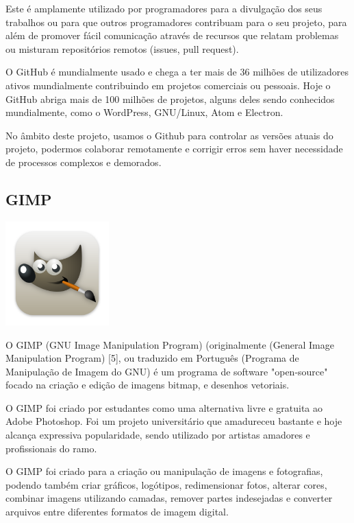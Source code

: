 \documentclass[a4paper,12pt]{article}
\begin{document}
Este é amplamente utilizado por programadores para a divulgação dos seus trabalhos ou para que outros programadores contribuam para o seu projeto, para além de promover fácil comunicação através de recursos que relatam problemas ou misturam repositórios remotos (issues, pull request).

O GitHub é mundialmente usado e chega a ter mais de 36 milhões de utilizadores ativos mundialmente contribuindo em projetos comerciais ou pessoais. Hoje o GitHub abriga mais de 100 milhões de projetos, alguns deles sendo conhecidos mundialmente, como o WordPress, GNU/Linux, Atom e Electron.

No âmbito deste projeto, usamos o Github para controlar as versões atuais do projeto, podermos colaborar remotamente e corrigir erros sem haver necessidade de processos complexos e demorados.

\subsection{GIMP}
    \includegraphics[width=0.3\textwidth]{gimp.png} %
    \vspace{0.5cm}

O GIMP (GNU Image Manipulation Program) (originalmente (General Image Manipulation Program) [5], ou traduzido em Português (Programa de Manipulação de Imagem do GNU) é um programa de software "open-source" focado na criação e edição de imagens bitmap, e desenhos vetoriais.

O GIMP foi criado por estudantes como uma alternativa livre e gratuita ao Adobe Photoshop. Foi um projeto universitário que amadureceu bastante e hoje alcança expressiva popularidade, sendo utilizado por artistas amadores e profissionais do ramo.

O GIMP foi criado para a criação ou manipulação de imagens e fotografias, podendo também criar gráficos, logótipos, redimensionar fotos, alterar cores, combinar imagens utilizando camadas, remover partes indesejadas e converter arquivos entre diferentes formatos de imagem digital.
\end{document}
